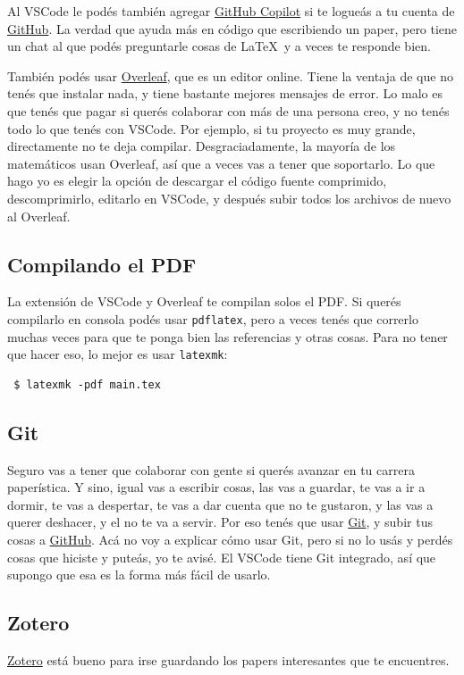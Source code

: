 \documentclass{article}
\begin{document}
Al VSCode le podés también agregar \href{https://github.com/features/copilot}{GitHub Copilot} si te logueás a tu cuenta de \href{https://github.com/}{GitHub}. La verdad que ayuda más en código que escribiendo un paper, pero tiene un chat al que podés preguntarle cosas de \LaTeX\ y a veces te responde bien.

También podés usar \href{https://www.overleaf.com/}{Overleaf}, que es un editor online. Tiene la ventaja de que no tenés que instalar nada, y tiene bastante mejores mensajes de error. Lo malo es que tenés que pagar si querés colaborar con más de una persona creo, y no tenés todo lo que tenés con VSCode. Por ejemplo, si tu proyecto es muy grande, directamente no te deja compilar. Desgraciadamente, la mayoría de los matemáticos usan Overleaf, así que a veces vas a tener que soportarlo. Lo que hago yo es elegir la opción de descargar el código fuente comprimido, descomprimirlo, editarlo en VSCode, y después subir todos los archivos de nuevo al Overleaf.

\subsection{Compilando el PDF}
La extensión de VSCode y Overleaf te compilan solos el PDF. Si querés compilarlo en consola podés usar \texttt{pdflatex}, pero a veces tenés que correrlo muchas veces para que te ponga bien las referencias y otras cosas. Para no tener que hacer eso, lo mejor es usar \texttt{latexmk}:
\begin{verbatim}
 $ latexmk -pdf main.tex
\end{verbatim}

\subsection{Git}
Seguro vas a tener que colaborar con gente si querés avanzar en tu carrera paperística. Y sino, igual vas a escribir cosas, las vas a guardar, te vas a ir a dormir, te vas a despertar, te vas a dar cuenta que no te gustaron, y las vas a querer deshacer, y el  no te va a servir. Por eso tenés que usar \href{https://git-scm.com/}{Git}, y subir tus cosas a \href{https://github.com/}{GitHub}. Acá no voy a explicar cómo usar Git, pero si no lo usás y perdés cosas que hiciste y puteás, yo te avisé. El VSCode tiene Git integrado, así que supongo que esa es la forma más fácil de usarlo.

\subsection{Zotero}
\href{https://www.zotero.org/}{Zotero} está bueno para irse guardando los papers interesantes que te encuentres.
\end{document}
